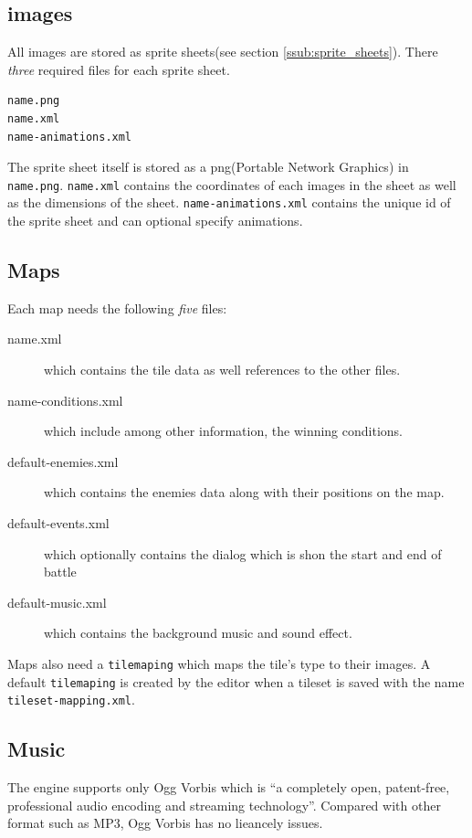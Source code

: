 \subsection{images}
All images are stored as sprite sheets(see section \ref{ssub:sprite_sheets}).  There \emph{three} required files for each sprite sheet. 
\begin{lstlisting}
name.png
name.xml
name-animations.xml
\end{lstlisting}
The sprite sheet itself is stored as  a png(Portable Network Graphics) in \texttt{name.png}. \texttt{name.xml} contains the coordinates of each images in the sheet as well as the dimensions of the sheet. \texttt{name-animations.xml} contains the unique id of the sprite sheet and can optional specify animations. 

\subsection{Maps}
\label{sub:amaps}

Each map needs the following \emph{five} files:
\begin{description}
	\item[name.xml] which contains the tile data as well references to the other files. 
	\item[name-conditions.xml]  which include among other information, the  winning conditions. 
	\item[default-enemies.xml]  which contains the enemies data along with their positions on the map.
	\item[default-events.xml]   which optionally contains the dialog which is shon the start and end of battle
	\item[default-music.xml]    which contains the background music and sound effect.
\end{description}

Maps also need a \texttt{tilemaping} which maps the tile's type to their images.  A default \texttt{tilemaping} is created by the editor when a tileset is saved with the name \texttt{tileset-mapping.xml}.

\subsection{Music}
The engine supports only Ogg Vorbis which is ``a completely open, patent-free, professional audio encoding and streaming technology''\cite{ogg}.
Compared with other format such as MP3, Ogg Vorbis has no lieancely issues. 

